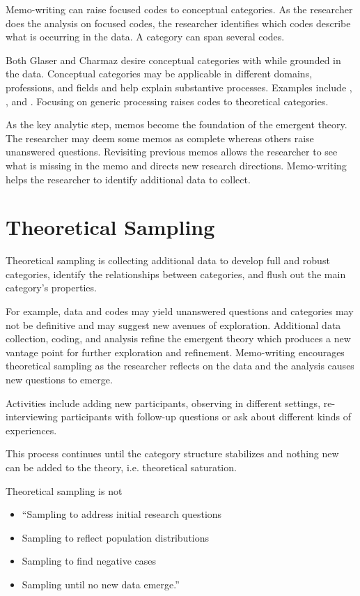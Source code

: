 Memo-writing can raise focused codes to conceptual categories. As the researcher does the analysis on focused codes, the researcher identifies which codes describe what is occurring in the data. A category can span several codes. 

Both Glaser and Charmaz desire conceptual categories with  \cite{Charmaz} while grounded in the data. Conceptual categories may be applicable in different domains, professions, and fields and help explain substantive processes. Examples include  \cite{KarabanowGettingOffTheStreet},  \cite{RiveraManagingSpoiledNationalIdentity}, and . Focusing on generic processing raises codes to theoretical categories. 

As the key analytic step, memos become the foundation of the emergent theory.  The researcher may deem some memos as complete whereas others raise unanswered questions. Revisiting previous memos allows the researcher to see what is missing in the memo and directs new research directions. Memo-writing helps the researcher to identify additional data to collect. 

\section{Theoretical Sampling}
Theoretical sampling is collecting additional data to develop full and robust categories, identify the relationships between categories, and flush out the main category's properties. 

For example, data and codes may yield unanswered questions and categories may not be definitive and may suggest new avenues of exploration. Additional data collection, coding, and analysis refine the emergent theory which produces a new vantage point for further exploration and refinement. Memo-writing encourages theoretical sampling as the researcher reflects on the data and the analysis causes new questions to emerge. 

Activities include adding new participants, observing in different settings, re-interviewing participants with follow-up questions or ask about different kinds of experiences.

This process continues until the category structure stabilizes and nothing new can be added to the theory, i.e. theoretical saturation. 

Theoretical sampling is not 
\begin{itemize}
\item ``Sampling to address initial research questions 
\item Sampling to reflect population distributions
\item Sampling to find negative cases
\item Sampling until no new data emerge.'' \cite{Charmaz}
\end{itemize}

